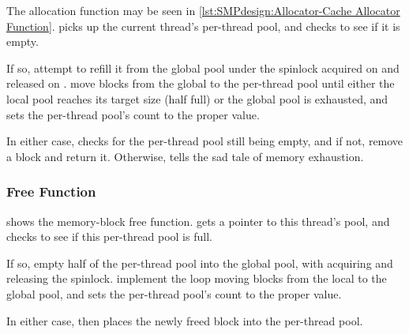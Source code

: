 \begin{fcvref}
The allocation function  may be seen in
\cref{lst:SMPdesign:Allocator-Cache Allocator Function}.
 picks up the current thread's per-thread pool,
and  checks to see if it is empty.

If so,  attempt to refill it
from the global pool
under the spinlock acquired on  and released on .
 move blocks from the global
to the per-thread pool until
either the local pool reaches its target size (half full) or
the global pool is exhausted, and  sets the per-thread pool's
count to the proper value.

In either case,  checks for the per-thread
pool still being
empty, and if not,  remove a block and return it.
Otherwise,  tells the sad tale of memory exhaustion.
\end{fcvref}

\begin{listing}

\caption{Allocator-Cache Allocator Function}
\label{lst:SMPdesign:Allocator-Cache Allocator Function}
\end{listing}

\subsubsection{Free Function}

\begin{fcvref}
 shows
the memory-block free function.
 gets a pointer to this thread's pool, and
 checks to see if this per-thread pool is full.

If so,  empty half of the per-thread pool
into the global pool,
with  acquiring and releasing the spinlock.
 implement the loop moving blocks
from the local to the
global pool, and  sets the per-thread pool's count to the proper
value.

In either case,  then places the newly freed block into the
per-thread pool.
\end{fcvref}

\begin{listing}

\caption{Allocator-Cache Free Function}
\label{lst:SMPdesign:Allocator-Cache Free Function}
\end{listing}

